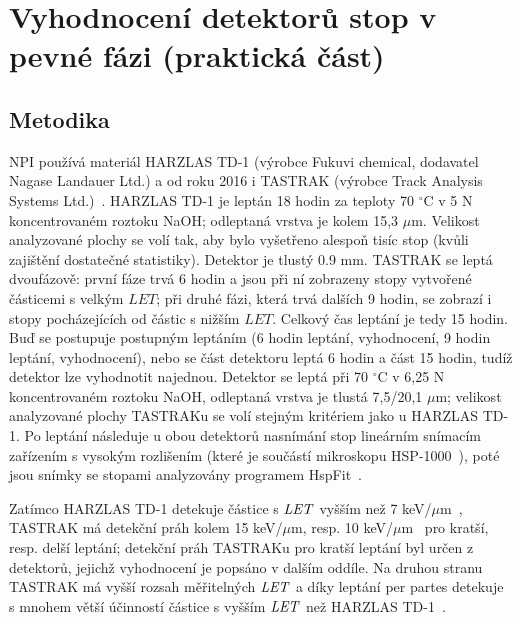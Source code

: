\chapter{Vyhodnocení detektorů stop v pevné fázi (praktická část)}
\section{Metodika}\label{sec:praktickaCast_metodika}
NPI používá materiál HARZLAS TD-1 (výrobce Fukuvi chemical, dodavatel Nagase Landauer Ltd.) a od roku 2016 i TASTRAK (výrobce Track Analysis Systems Ltd.)~\cite{cesky}. HARZLAS TD-1 je leptán 18 hodin za teploty 70 $^{\circ}$C v 5 N koncentrovaném roztoku NaOH; odleptaná vrstva je kolem 15,3 $\mu$m. Velikost analyzované plochy se volí tak, aby bylo vyšetřeno alespoň tisíc stop (kvůli zajištění dostatečné statistiky). Detektor je tlustý 0.9 mm. TASTRAK se leptá dvoufázově: první fáze trvá 6 hodin a jsou při ní zobrazeny stopy vytvořené částicemi s velkým $\mathit{LET}$; při druhé fázi, která trvá dalších 9 hodin, se zobrazí i stopy pocházejících od částic s nižším $\mathit{LET}$. Celkový čas leptání je tedy 15 hodin. Buď se postupuje postupným leptáním (6 hodin leptání, vyhodnocení, 9 hodin leptání, vyhodnocení), nebo se část detektoru leptá 6 hodin a část 15 hodin, tudíž
detektor lze vyhodnotit najednou. Detektor se leptá při 70 $^{\circ}$C v 6,25 N koncentrovaném roztoku NaOH, odleptaná vrstva je tlustá 7,5/20,1 $\mu$m; velikost analyzované plochy TASTRAKu se volí stejným kritériem jako u HARZLAS TD-1. Po leptání následuje u obou detektorů nasnímání stop lineárním snímacím zařízením s vysokým rozlišením (které je součástí mikroskopu HSP-1000~\cite{dosis_HSP1000}), poté jsou snímky se stopami analyzovány programem HspFit~\cite{hspClanek}.

Zatímco HARZLAS TD-1 detekuje částice s $\mathit{LET}$ vyšším než 7 keV/$\mu$m~\cite{cesky}, TASTRAK má detekční práh kolem 15 keV/$\mu$m, resp. 10 keV/$\mu$m~\cite{ssntd} pro kratší, resp. delší leptání; detekční práh TASTRAKu pro kratší leptání byl určen z detektorů, jejichž vyhodnocení je popsáno v dalším oddíle. Na druhou stranu TASTRAK má vyšší rozsah měřitelných $\mathit{LET}$ a díky leptání per partes detekuje s mnohem větší účinností částice s vyšším $\mathit{LET}$ než HARZLAS TD-1~\cite{cesky}.
\newpage
